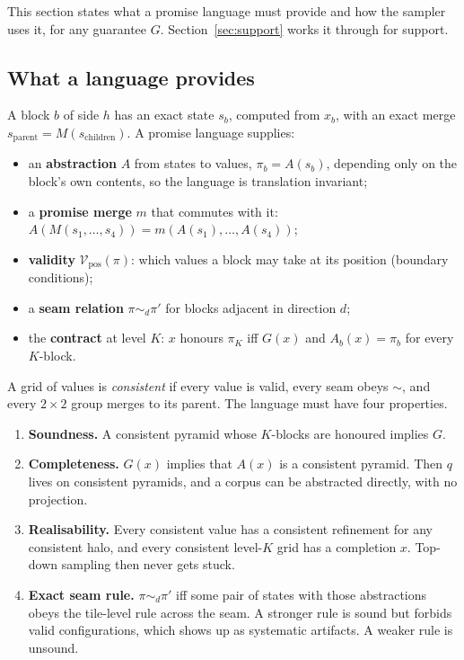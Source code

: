\documentclass[11pt]{article}
\newcommand{\1}{\mathds{1}}
\begin{document}
This section states what a promise language must provide and how the sampler uses it, for any
guarantee $G$. Section~\ref{sec:support} works it through for support.

\subsection{What a language provides}

A block $b$ of side $h$ has an exact state $s_b$, computed from $x_b$, with an exact merge
$s_{\text{parent}} = M(s_{\text{children}})$. A promise language supplies:
\begin{itemize}
  \item an \textbf{abstraction} $A$ from states to values, $\pi_b = A(s_b)$, depending only on
        the block's own contents, so the language is translation invariant;
  \item a \textbf{promise merge} $m$ that commutes with it:
        $A(M(s_1,\dots,s_4)) = m(A(s_1),\dots,A(s_4))$;
  \item \textbf{validity} $\mathcal V_{\mathrm{pos}}(\pi)$: which values a block may take at
        its position (boundary conditions);
  \item a \textbf{seam relation} $\pi \sim_d \pi'$ for blocks adjacent in direction $d$;
  \item the \textbf{contract} at level $K$: $x$ honours $\pi_K$ iff $G(x)$ and
        $A_b(x) = \pi_b$ for every $K$-block.
\end{itemize}
A grid of values is \emph{consistent} if every value is valid, every seam obeys $\sim$, and
every $2\times2$ group merges to its parent. The language must have four properties.
\begin{enumerate}
  \item \textbf{Soundness.} A consistent pyramid whose $K$-blocks are honoured implies $G$.
  \item \textbf{Completeness.} $G(x)$ implies that $A(x)$ is a consistent pyramid. Then $q$
        lives on consistent pyramids, and a corpus can be abstracted directly, with no
        projection.
  \item \textbf{Realisability.} Every consistent value has a consistent refinement for any
        consistent halo, and every consistent level-$K$ grid has a completion $x$. Top-down
        sampling then never gets stuck.
  \item \textbf{Exact seam rule.} $\pi \sim_d \pi'$ iff some pair of states with those
        abstractions obeys the tile-level rule across the seam. A stronger rule is sound but
        forbids valid configurations, which shows up as systematic artifacts. A weaker rule is
        unsound.
\end{enumerate}
\end{document}

